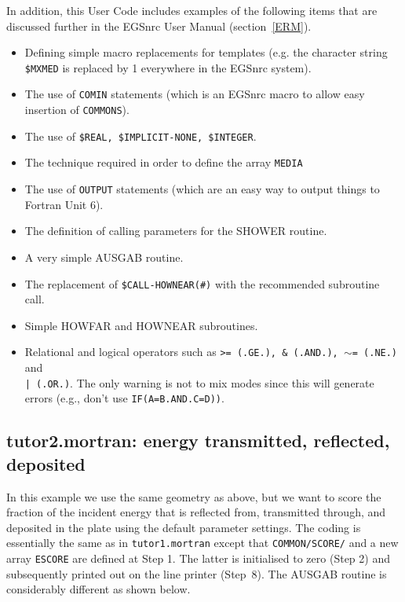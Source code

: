 In addition, this User Code includes examples of the following items
that are discussed further in the EGSnrc User Manual (section~\ref{ERM}).
\begin{itemize}
\item Defining simple macro replacements for templates
(e.g. the character string {\tt \$MXMED}
is replaced by 1 everywhere in the EGSnrc system).
%
\item The use of {\tt COMIN} statements (which is an EGSnrc macro to allow
easy insertion of {\tt COMMONS}).

\item The use of {\tt \$REAL, \$IMPLICIT-NONE, \$INTEGER}.
  
%
\item The technique required in order to define the array {\tt MEDIA}

\item The use of {\tt OUTPUT} statements (which are an easy way to output
things to Fortran Unit 6).
%
\item The definition of calling parameters for the SHOWER routine.
%
\item A very simple AUSGAB routine.

\item The replacement of {\tt \$CALL-HOWNEAR(\#)} with the recommended
subroutine call.

\item Simple HOWFAR and HOWNEAR subroutines.

\item Relational and logical operators such as
{\tt >= (.GE.), \& (.AND.), $\sim$= (.NE.)} and\\ {\tt  | (.OR.)}.  The only
warning is not to mix modes since this will generate errors (e.g.,
don't use {\tt IF(A=B.AND.C=D))}.
\end{itemize}


\subsection{tutor2.mortran: energy transmitted, reflected, deposited}

In this example we use the same geometry as above, but we want to score
the fraction of the incident energy that is reflected from, transmitted
through, and deposited in the plate using the default parameter settings.
The coding is essentially the same as in {\tt tutor1.mortran} except that
{\tt COMMON/SCORE/} and a new array {\tt ESCORE} are defined at Step 1.
The latter is initialised to zero (Step 2) and subsequently printed
out on the line printer (Step~8).  The AUSGAB routine is considerably
different as shown below.

